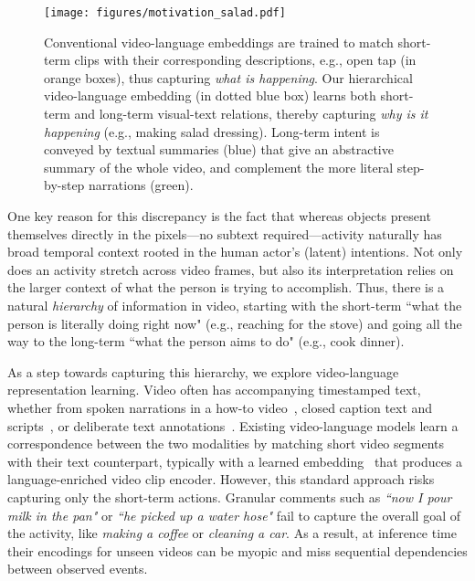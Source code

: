 \documentclass[10pt,twocolumn,letterpaper]{article}
\begin{document}
\begin{figure}[t]
\centering
\texttt{[image: figures/motivation\_salad.pdf]}
\caption{Conventional video-language embeddings are trained to match short-term clips with their corresponding descriptions, e.g., open tap (in orange boxes), thus capturing \emph{what is happening}. Our hierarchical video-language embedding (in dotted blue box) learns both short-term and long-term visual-text relations, thereby capturing \emph{why is it happening} (e.g., making salad dressing). Long-term intent is conveyed by textual summaries (blue) that give an abstractive summary of the whole video, and complement the more literal step-by-step narrations (green).
}\label{fig:motivation}
\vspace{-0.10in}
\end{figure}


One key reason for this discrepancy is the fact that whereas objects present themselves directly in the pixels---no subtext required---activity naturally has broad temporal context rooted in the human actor's (latent) intentions.  Not only does an activity stretch across video frames, but also its interpretation  relies on the larger context of what the person is trying to accomplish.  Thus, there is a natural \emph{hierarchy} of information in video, starting with the short-term ``what the person is literally doing right now" (e.g., reaching for the stove) and going all the way to the long-term ``what the person aims to do" (e.g., cook dinner).


As a step towards capturing this hierarchy, we explore video-language representation learning. Video often has accompanying timestamped text, whether from spoken narrations in a how-to video~\cite{howto100m,coin,crosstask}, closed caption text and scripts~\cite{activitynet,movieqa}, or  deliberate text annotations~\cite{msr-vtt,epic-kitchens-100,ego4d}.  
Existing video-language models learn a correspondence between the two modalities by matching short video segments with their text counterpart, typically with a learned embedding~\cite{egovlp,mil-nce,videoclip,frozenintime} that produces a language-enriched video clip encoder.  
However, this standard approach risks capturing only the short-term actions. Granular comments such as \textit{``now I pour milk in the pan"} or \textit{``he picked up a water hose"} fail to capture the overall goal of the activity, like \textit{making a coffee} or \textit{cleaning a car}.  As a result, at inference time their encodings for unseen videos can be myopic and miss sequential dependencies between observed events.
\end{document}
